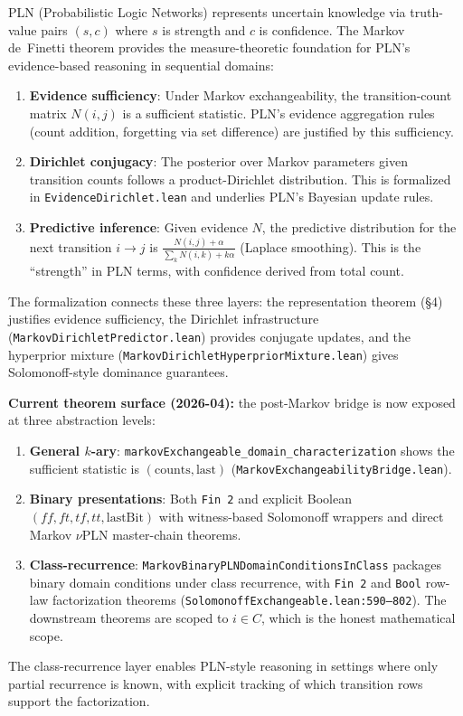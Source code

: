 \documentclass[11pt,a4paper]{article}
\theoremstyle{definition}
\begin{document}
PLN (Probabilistic Logic Networks) represents uncertain knowledge via
truth-value pairs $(s, c)$ where $s$ is strength and $c$ is confidence.
The Markov de~Finetti theorem provides the measure-theoretic foundation
for PLN's evidence-based reasoning in sequential domains:

\begin{enumerate}
\item \textbf{Evidence sufficiency}: Under Markov exchangeability,
  the transition-count matrix $N(i,j)$ is a sufficient statistic.
  PLN's evidence aggregation rules (count addition, forgetting via
  set difference) are justified by this sufficiency.
\item \textbf{Dirichlet conjugacy}: The posterior over Markov parameters
  given transition counts follows a product-Dirichlet distribution.
  This is formalized in \texttt{EvidenceDirichlet.lean} and underlies
  PLN's Bayesian update rules.
\item \textbf{Predictive inference}: Given evidence $N$, the predictive
  distribution for the next transition $i \to j$ is
  $\frac{N(i,j) + \alpha}{\sum_k N(i,k) + k\alpha}$ (Laplace smoothing).
  This is the ``strength'' in PLN terms, with confidence derived from
  total count.
\end{enumerate}

The formalization connects these three layers: the representation theorem
(\S4) justifies evidence sufficiency, the Dirichlet infrastructure
(\texttt{MarkovDirichletPredictor.lean}) provides conjugate updates,
and the hyperprior mixture (\texttt{MarkovDirichletHyperpriorMixture.lean})
gives Solomonoff-style dominance guarantees.

\medskip

\noindent\textbf{Current theorem surface (2026-04):} the post-Markov bridge is
now exposed at three abstraction levels:
\begin{enumerate}
\item \textbf{General $k$-ary}: \texttt{markovExchangeable\_domain\_characterization}
  shows the sufficient statistic is $(\mathrm{counts}, \mathrm{last})$
  (\texttt{MarkovExchangeabilityBridge.lean}).
\item \textbf{Binary presentations}: Both \texttt{Fin 2} and explicit Boolean
  $(ff,ft,tf,tt,\mathrm{lastBit})$ with witness-based Solomonoff wrappers and
  direct Markov $\nu$PLN master-chain theorems.
\item \textbf{Class-recurrence}: \texttt{MarkovBinaryPLNDomainConditionsInClass}
  packages binary domain conditions under class recurrence, with
  \texttt{Fin 2} and \texttt{Bool} row-law factorization theorems
  (\texttt{SolomonoffExchangeable.lean:590--802}). The downstream theorems
  are scoped to $i \in C$, which is the honest mathematical scope.
\end{enumerate}
The class-recurrence layer enables PLN-style reasoning in settings where only
partial recurrence is known, with explicit tracking of which transition rows
support the factorization.
\end{document}
